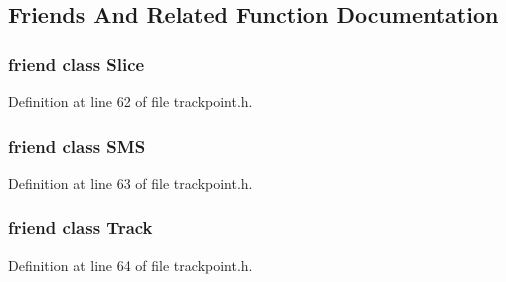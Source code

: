 \subsection{Friends And Related Function Documentation}
\subsubsection[{\texorpdfstring{Slice}{Slice}}]{\setlength{\rightskip}{0pt plus 5cm}friend class {\bf Slice}\hspace{0.3cm}{\ttfamily [friend]}}\hypertarget{class__sbsms___1_1_track_point_af5899f89d7315d134ff0078c9fade832}{}\label{class__sbsms___1_1_track_point_af5899f89d7315d134ff0078c9fade832}


Definition at line 62 of file trackpoint.\+h.

\subsubsection[{\texorpdfstring{S\+MS}{SMS}}]{\setlength{\rightskip}{0pt plus 5cm}friend class {\bf S\+MS}\hspace{0.3cm}{\ttfamily [friend]}}\hypertarget{class__sbsms___1_1_track_point_ae2e50c4e133202e0676be10c4db4f039}{}\label{class__sbsms___1_1_track_point_ae2e50c4e133202e0676be10c4db4f039}


Definition at line 63 of file trackpoint.\+h.

\subsubsection[{\texorpdfstring{Track}{Track}}]{\setlength{\rightskip}{0pt plus 5cm}friend class {\bf Track}\hspace{0.3cm}{\ttfamily [friend]}}\hypertarget{class__sbsms___1_1_track_point_ac9187679244c6a3414c63aae65f83a2e}{}\label{class__sbsms___1_1_track_point_ac9187679244c6a3414c63aae65f83a2e}


Definition at line 64 of file trackpoint.\+h.



